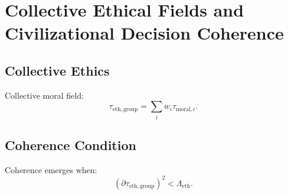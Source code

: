 \chapter{Collective Ethical Fields and Civilizational Decision Coherence}

\section{Collective Ethics}
Collective moral field:
\[
\tau_{\mathrm{eth,group}} = \sum_i w_i \tau_{\mathrm{moral},i}.
\]

\section{Coherence Condition}
Coherence emerges when:
\[
(\partial\tau_{\mathrm{eth,group}})^2 < \Lambda_{\mathrm{eth}}.
\]

